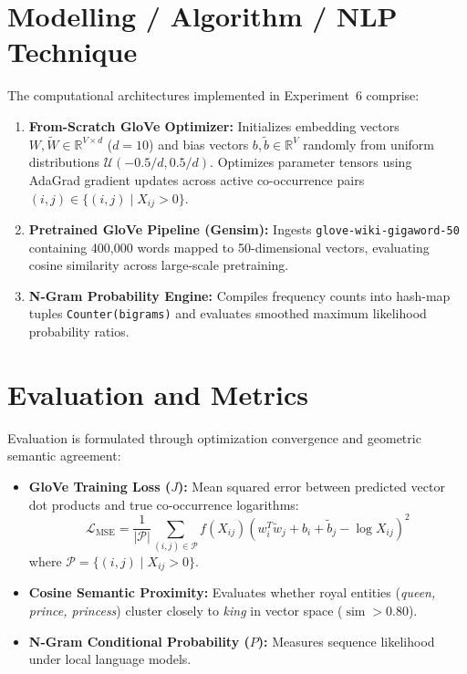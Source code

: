 \section{Modelling / Algorithm / NLP Technique}
The computational architectures implemented in Experiment~6 comprise:
\begin{enumerate}
    \item \textbf{From-Scratch GloVe Optimizer:} Initializes embedding vectors $W, \tilde{W} \in \mathbb{R}^{V \times d}$ ($d=10$) and bias vectors $b, \tilde{b} \in \mathbb{R}^V$ randomly from uniform distributions $\mathcal{U}(-0.5/d, 0.5/d)$. Optimizes parameter tensors using AdaGrad gradient updates across active co-occurrence pairs $(i, j) \in \{(i, j) \mid X_{ij} > 0\}$.
    \item \textbf{Pretrained GloVe Pipeline (Gensim):} Ingests \texttt{glove-wiki-gigaword-50} containing 400,000 words mapped to 50-dimensional vectors, evaluating cosine similarity across large-scale pretraining.
    \item \textbf{N-Gram Probability Engine:} Compiles frequency counts into hash-map tuples \texttt{Counter(bigrams)} and evaluates smoothed maximum likelihood probability ratios.
\end{enumerate}

\section{Evaluation and Metrics}
Evaluation is formulated through optimization convergence and geometric semantic agreement:
\begin{itemize}
    \item \textbf{GloVe Training Loss ($J$):} Mean squared error between predicted vector dot products and true co-occurrence logarithms:
    \begin{equation}
        \mathcal{L}_{\text{MSE}} = \frac{1}{|\mathcal{P}|} \sum_{(i, j) \in \mathcal{P}} f(X_{ij}) (w_i^T \tilde{w}_j + b_i + \tilde{b}_j - \log X_{ij})^2
    \end{equation}
    where $\mathcal{P} = \{(i, j) \mid X_{ij} > 0\}$.
    \item \textbf{Cosine Semantic Proximity:} Evaluates whether royal entities (\textit{queen, prince, princess}) cluster closely to \textit{king} in vector space ($\operatorname{sim} > 0.80$).
    \item \textbf{N-Gram Conditional Probability ($P$):} Measures sequence likelihood under local language models.
\end{itemize}

